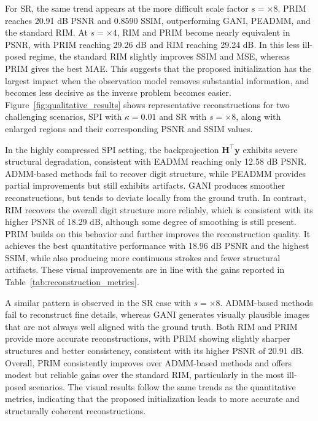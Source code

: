 \documentclass[conference]{IEEEtran}
\begin{document}
For SR, the same trend appears at the more difficult scale factor $s=\times8$. PRIM reaches 20.91 dB PSNR and 0.8590 SSIM, outperforming GANI, PEADMM, and the standard RIM. At $s=\times4$, RIM and PRIM become nearly equivalent in PSNR, with PRIM reaching 29.26 dB and RIM reaching 29.24 dB. In this less ill-posed regime, the standard RIM slightly improves SSIM and MSE, whereas PRIM gives the best MAE. This suggests that the proposed initialization has the largest impact when the observation model removes substantial information, and becomes less decisive as the inverse problem becomes easier. Figure~\ref{fig:qualitative_results} shows representative reconstructions for two challenging scenarios, SPI with $\kappa = 0.01$ and SR with $s=\times 8$, along with enlarged regions and their corresponding PSNR and SSIM values.

In the highly compressed SPI setting, the backprojection $\mathbf{H}^{\top}\mathbf{y}$ exhibits severe structural degradation, consistent with EADMM reaching only 12.58 dB PSNR. ADMM-based methods fail to recover digit structure, while PEADMM provides partial improvements but still exhibits artifacts. GANI produces smoother reconstructions, but tends to deviate locally from the ground truth. In contrast, RIM recovers the overall digit structure more reliably, which is consistent with its higher PSNR of 18.29 dB, although some degree of smoothing is still present. PRIM builds on this behavior and further improves the reconstruction quality. It achieves the best quantitative performance with 18.96 dB PSNR and the highest SSIM, while also producing more continuous strokes and fewer structural artifacts. These visual improvements are in line with the gains reported in Table~\ref{tab:reconstruction_metrics}.

A similar pattern is observed in the SR case with $s=\times 8$. ADMM-based methods fail to reconstruct fine details, whereas GANI generates visually plausible images that are not always well aligned with the ground truth. Both RIM and PRIM provide more accurate reconstructions, with PRIM showing slightly sharper structures and better consistency, consistent with its higher PSNR of 20.91 dB. Overall, PRIM consistently improves over ADMM-based methods and offers modest but reliable gains over the standard RIM, particularly in the most ill-posed scenarios. The visual results follow the same trends as the quantitative metrics, indicating that the proposed initialization leads to more accurate and structurally coherent reconstructions.
\end{document}
